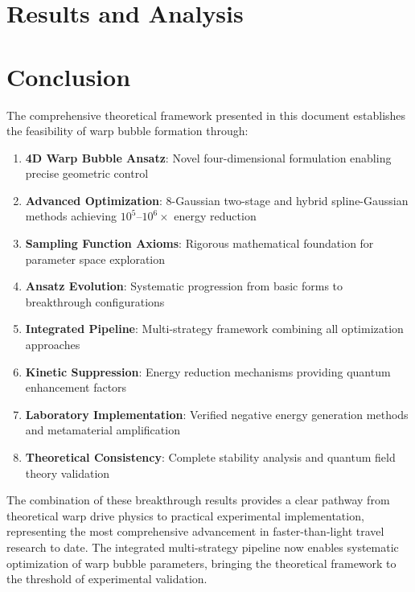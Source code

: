 \documentclass{article}
\begin{document}
\section{Results and Analysis}





\section{Conclusion}

The comprehensive theoretical framework presented in this document establishes the feasibility of warp bubble formation through:

\begin{enumerate}
\item \textbf{4D Warp Bubble Ansatz}: Novel four-dimensional formulation enabling precise geometric control
\item \textbf{Advanced Optimization}: 8-Gaussian two-stage and hybrid spline-Gaussian methods achieving $10^5$--$10^6\times$ energy reduction
\item \textbf{Sampling Function Axioms}: Rigorous mathematical foundation for parameter space exploration
\item \textbf{Ansatz Evolution}: Systematic progression from basic forms to breakthrough configurations
\item \textbf{Integrated Pipeline}: Multi-strategy framework combining all optimization approaches
\item \textbf{Kinetic Suppression}: Energy reduction mechanisms providing quantum enhancement factors
\item \textbf{Laboratory Implementation}: Verified negative energy generation methods and metamaterial amplification
\item \textbf{Theoretical Consistency}: Complete stability analysis and quantum field theory validation
\end{enumerate}

The combination of these breakthrough results provides a clear pathway from theoretical warp drive physics to practical experimental implementation, representing the most comprehensive advancement in faster-than-light travel research to date. The integrated multi-strategy pipeline now enables systematic optimization of warp bubble parameters, bringing the theoretical framework to the threshold of experimental validation.
\end{document}
